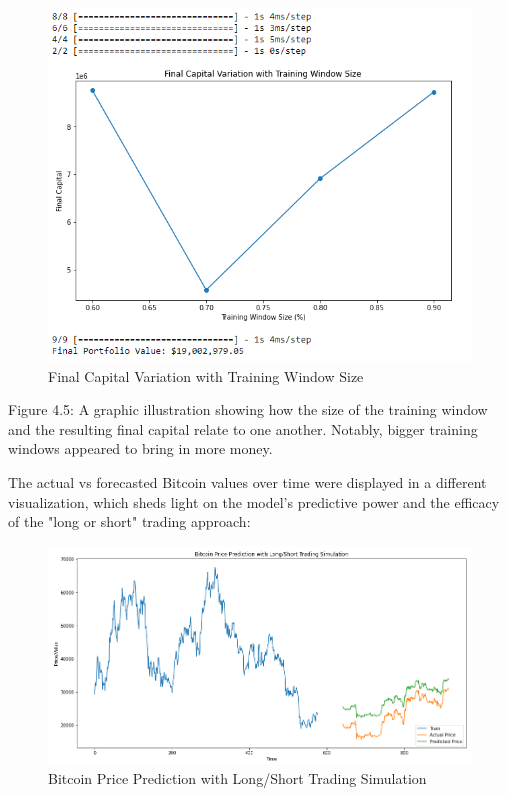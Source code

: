\begin{figure}[H]
\centering
\includegraphics[scale=0.85]{fig9.jpg}
\caption{Final Capital Variation with Training Window Size}
\label{Final Capital Variation with Training Window Size}
\end{figure}

Figure 4.5: A graphic illustration showing how the size of the training window and the resulting final capital relate to one another. Notably, bigger training windows appeared to bring in more money.

The actual vs forecasted Bitcoin values over time were displayed in a different visualization, which sheds light on the model's predictive power and the efficacy of the "long or short" trading approach:



\begin{figure}[H]
\centering
\includegraphics[scale=0.65]{fig10.jpg}
\caption{Bitcoin Price Prediction with Long/Short Trading Simulation }
\label{Bitcoin Price Prediction with Long/Short Trading Simulation }
\end{figure}

